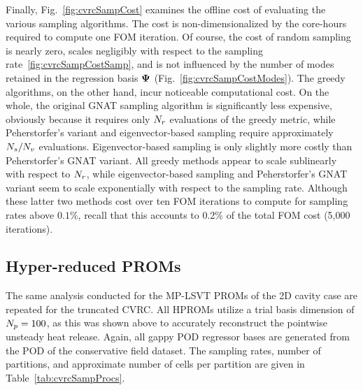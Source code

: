 Finally, Fig.~\ref{fig:cvrcSampCost} examines the offline cost of evaluating the various sampling algorithms. The cost is non-dimensionalized by the core-hours required to compute one FOM iteration. Of course, the cost of random sampling is nearly zero, scales negligibly with respect to the sampling rate~\ref{fig:cvrcSampCostSamp}, and is not influenced by the number of modes retained in the regression basis $\deimBasis$ (Fig.~\ref{fig:cvrcSampCostModes}). The greedy algorithms, on the other hand, incur noticeable computational cost. On the whole, the original GNAT sampling algorithm is significantly less expensive, obviously because it requires only $N_r$ evaluations of the greedy metric, while Peherstorfer's variant and eigenvector-based sampling require approximately $N_s / N_{v}$ evaluations. Eigenvector-based sampling is only slightly more costly than Peherstorfer's GNAT variant. All greedy methods appear to scale sublinearly with respect to $N_r$, while eigenvector-based sampling and Peherstorfer's GNAT variant seem to scale exponentially with respect to the sampling rate. Although these latter two methods cost over ten FOM iterations to compute for sampling rates above $0.1\%$, recall that this accounts to 0.2\% of the total FOM cost (5,000 iterations). 

\subsection{Hyper-reduced PROMs}

The same analysis conducted for the MP-LSVT PROMs of the 2D cavity case are repeated for the truncated CVRC. All HPROMs utilize a trial basis dimension of $N_p = 100$, as this was shown above to accurately reconstruct the pointwise unsteady heat release. Again, all gappy POD regressor bases are generated from the POD of the conservative field dataset. The sampling rates, number of partitions, and approximate number of cells per partition are given in Table~\ref{tab:cvrcSampProcs}.


